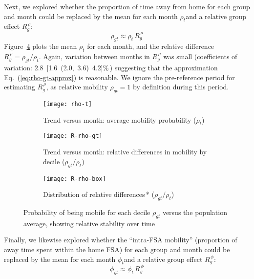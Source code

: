\par
Next, we explored whether the proportion of time away from home
for each group and month could be replaced by
the mean for each month $\rho_{t}$and a relative group effect $R^{\,\rho}_{g}$:
\begin{equation}\label{eq:rho-gt-approx}
  \rho_{gt} \approx \rho_{t}\,R^{\,\rho}_{g}
\end{equation}
Figure~\ref{fig:rho} plots the mean $\rho_{t}$ for each month,
and the relative difference $R^{\,\rho}_{g} = \rho_{gt} / \rho_{t}$.
Again, variation between months in $R^{\,\rho}_{g}$ was small
(coefficients of variation: 2.8~[1.6~(2.0,~3.6)~4.2]\%\,)
suggesting that the approximation Eq.~(\ref{eq:rho-gt-approx}) is reasonable.
We ignore the pre-\covid reference period for estimating $R^{\,\rho}_{g}$,
as relative mobility $\rho_{gt} = 1$ by definition during this period.
\begin{figure}[bt]
  \begin{subfigure}[t]{0.297\linewidth}
    \texttt{[image: rho-t]}
    \caption{Trend versus month: average mobility probability ($\rho_{t}$)}
    \label{fig:rho-t}
  \end{subfigure}\hfill
  \begin{subfigure}[t]{0.33\linewidth}
    \texttt{[image: R-rho-gt]}
    \caption{Trend versus month: relative differences in mobility by decile ($\rho_{gt} / \rho_{t}$)}
    \label{fig:rho-gt}
  \end{subfigure}\hfill
  \begin{subfigure}[t]{0.33\linewidth}
    \texttt{[image: R-rho-box]}
    \caption{Distribution of relative differences\,* ($\rho_{gt} / \rho_{t}$)}
    \label{fig:rho-box}
  \end{subfigure}
  \caption{Probability of being mobile for each decile $\rho_{gt}$
    versus the population average,
    showing relative stability over time}
  \label{fig:rho}
\end{figure}
\par
Finally, we likewise explored whether the ``intra-FSA mobility''
(proportion of away time spent within the home FSA)
for each group and month could be replaced by
the mean for each month $\phi_{t}$and a relative group effect $R^{\,\phi}_{g}$:
\begin{equation}\label{eq:phi-gt-approx}
  \phi_{gt} \approx \phi_{t}\,R^{\,\phi}_{g}
\end{equation}

